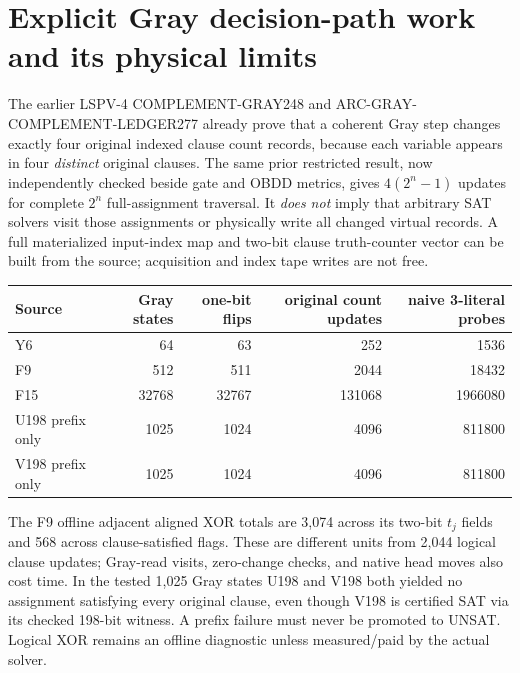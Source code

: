 \documentclass[11pt]{article}
\begin{document}
\section{Explicit Gray decision-path work and its physical limits}
The earlier LSPV-4 COMPLEMENT-GRAY248 and ARC-GRAY-COMPLEMENT-LEDGER277 already prove that a coherent Gray step changes exactly four original indexed clause count records, because each variable appears in four \emph{distinct} original clauses. The same prior restricted result, now independently checked beside gate and OBDD metrics, gives $4(2^n-1)$ updates for complete $2^n$ full-assignment traversal. It \emph{does not} imply that arbitrary SAT solvers visit those assignments or physically write all changed virtual records. A full materialized input-index map and two-bit clause truth-counter vector can be built from the source; acquisition and index tape writes are not free.

\begin{center}\small
\begin{tabular}{lrrrr}
\toprule
Source & Gray states & one-bit flips & original count updates & naive 3-literal probes\\
\midrule
Y6 & 64 & 63 & 252 & 1536\\
F9 & 512 & 511 & 2044 & 18432\\
F15 & 32768 & 32767 & 131068 & 1966080\\
U198 prefix only & 1025 & 1024 & 4096 & 811800\\
V198 prefix only & 1025 & 1024 & 4096 & 811800\\
\bottomrule
\end{tabular}
\end{center}
The F9 offline adjacent aligned XOR totals are 3,074 across its two-bit $t_j$ fields and 568 across clause-satisfied flags. These are different units from 2,044 logical clause updates; Gray-read visits, zero-change checks, and native head moves also cost time. In the tested 1,025 Gray states U198 and V198 both yielded no assignment satisfying every original clause, even though V198 is certified SAT via its checked 198-bit witness. A prefix failure must never be promoted to UNSAT. Logical XOR remains an offline diagnostic unless measured/paid by the actual solver.
\end{document}
